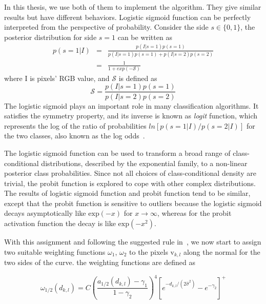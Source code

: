 In this thesis, we use both of them to implement the algorithm. They give
similar results but have different behaviors. Logistic sigmoid function
can be perfectly interpreted from the perspective of
probability. Consider the side $s \in \{0,1\}$, the posterior
distribution for side $s = 1$ can be written as
\begin{eqnarray}
  \label{eq:pdfs}
  p(s=1|I) &=& \frac{p(I|s=1)p(s=1)}{p(I|s=1)p(s=1)
    + p(I|s=2)p(s=2)}\\
&=&  \frac{1}{1+exp(-\mathcal{S})}
\end{eqnarray}
where I is pixels' RGB value, and $\mathcal{S}$ is defined as
\begin{equation}
  \label{eq:ratio}
  \mathcal{S} = \frac{p(I|s=1)p(s=1)}{p(I|s=2)p(s=2)}
\end{equation}
The logistic sigmoid plays an important role in many classification
algorithms. It satisfies the symmetry property, and its inverse 
is known as \textit{logit} function, which represents the log of the
ratio of probabilities $ln [p(s=1|I)/p(s=2|I)]$ for the two classes,
also known as the log odds~\cite{bishop2006pattern}.

The logistic sigmoid function can be used to transform a broad range
of class-conditional distributions, described by the exponential
family, to a non-linear posterior class probabilities. Since not all choices of
class-conditional density are trivial, the probit function is explored
to cope with other complex distributions. The results of logistic
sigmoid function and probit function tend to be similar, except that the
probit function is sensitive to outliers because the logistic sigmoid
decays asymptotically like $\mathrm{exp}(-x)$ for $x \rightarrow \infty$, whereas
for the probit activation function the decay is like $\mathrm{exp}(-x^2)$.


With this assignment and following the suggested rule in~\cite{hanek2004contracting}, we now start to assign two suitable weighting functions
$\omega_1$, $\omega_2$ to the pixels $\mathrm{v}_{k,l}$ along the
normal for the two sides of the curve. the weighting functions are
defined as

\begin{equation}
  \label{eq:weight}
  \omega_{1/2}(d_{k,l}) = C\left(\frac{a_{1/2}(d_{k,l}) -
    \gamma_1}{1-\gamma_2}\right)^4 \left[e^{-d_{k,l}/(2\hat{\sigma}^2)} - e^{-\gamma_2}\right]^+
\end{equation}


